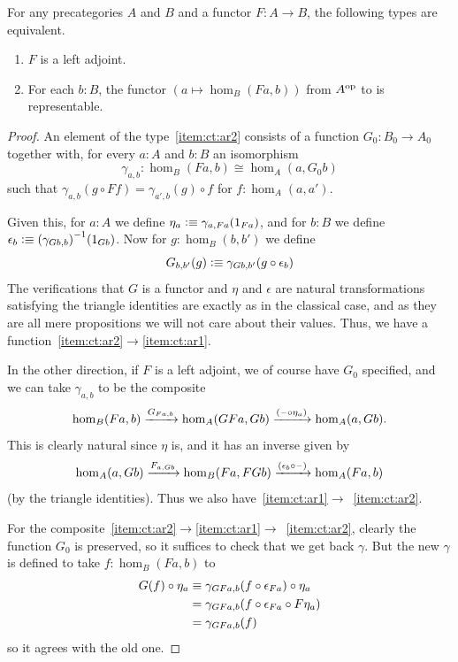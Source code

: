 \begin{lem}\label{ct:adj-repr}
  For any precategories $A$ and $B$ and a functor $F:A\to B$, the following types are equivalent.
  \begin{enumerate}
  \item $F$ is a left adjoint.\label{item:ct:ar1}
  \item For each $b:B$, the functor $(a \mapsto \hom_B(Fa,b))$ from $A^{\mathrm{op}}$ to \uset is representable.\label{item:ct:ar2}
  \end{enumerate}
\end{lem}
\begin{proof}
  An element of the type~\ref{item:ct:ar2} consists of a function $G_0:B_0 \to A_0$ together with, for every $a:A$ and $b:B$ an isomorphism
  \[ \gamma_{a,b}:\hom_B(Fa,b) \cong \hom_A(a,G_0 b) \]
  such that $\gamma_{a,b}(g \circ Ff) = \gamma_{a',b}(g)\circ f$ for $f:\hom_{A}(a,a')$.

  Given this, for $a:A$ we define $\eta_a \vcentcolon\equiv \gamma_{a,Fa}(1_{Fa})$, and for $b:B$ we define $\epsilon_b \vcentcolon\equiv {(\gamma_{Gb,b})}^{-1}(1_{Gb})$.
  Now for $g:\hom_B(b,b')$ we define
  \[ G_{b,b'}(g) \vcentcolon\equiv \gamma_{G b, b'}(g \circ \epsilon_b) \]
  The verifications that $G$ is a functor and $\eta$ and $\epsilon$ are natural transformations satisfying the triangle identities are exactly as in the classical case, and as they are all mere propositions we will not care about their values.
  Thus, we have a function~\ref{item:ct:ar2}$\to$\ref{item:ct:ar1}.

  In the other direction, if $F$ is a left adjoint, we of course have $G_0$ specified, and we can take $\gamma_{a,b}$ to be the composite
  \[ \hom_B(Fa,b)
  \xrightarrow{G_{Fa,b}} \hom_A(GFa,Gb)
  \xrightarrow{(\mathord{\hspace{1pt}\text{--}\hspace{1pt}}\circ \eta_a)} \hom_A(a,Gb).
  \]
  This is clearly natural since $\eta$ is, and it has an inverse given by
  \[ \hom_A(a,Gb)
  \xrightarrow{F_{a,Gb}} \hom_B(Fa,FGb)
  \xrightarrow{(\epsilon_b \circ \mathord{\hspace{1pt}\text{--}\hspace{1pt}} )} \hom_A(Fa,b)
  \]
  (by the triangle identities).
  Thus we also have~\ref{item:ct:ar1}$\to$~\ref{item:ct:ar2}.

  For the composite~\ref{item:ct:ar2}$\to$\ref{item:ct:ar1}$\to$~\ref{item:ct:ar2}, clearly the function $G_0$ is preserved, so it suffices to check that we get back $\gamma$.
  But the new $\gamma$ is defined to take $f:\hom_B(Fa,b)$ to
  \begin{align*}
    G(f) \circ \eta_a
    &\equiv \gamma_{G Fa, b}(f \circ \epsilon_{Fa}) \circ \eta_a\\
    &= \gamma_{G Fa, b}(f \circ \epsilon_{Fa} \circ F\eta_a)\\
    &= \gamma_{G Fa, b}(f)
  \end{align*}
  so it agrees with the old one.


\end{proof}
